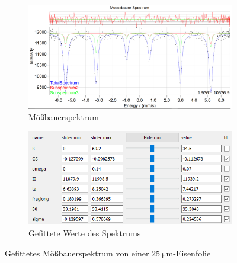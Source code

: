 \documentclass[german, %
parskip=full, %
bibliography=totoc, %
]{scrartcl}
\begin{document}
\begin{figure}[ht]
	\centering
	\begin{subfigure}[b]{0.5\textwidth}
		\includegraphics[width=\textwidth]{MoessbauerEisen25}
	  \caption{Mößbauerspektrum}
	  \label{fig:moess25}
  \end{subfigure}
  \begin{subfigure}[b]{0.4\textwidth}
	  \includegraphics[width=\textwidth]{WerteEisen25}
	  \caption{Gefittete Werte des Spektrums}
	  \label{fig:werte25}
  \end{subfigure}
	\caption{Gefittetes Mößbauerspektrum von einer \(\SI{25}{\micro\meter}\)-Eisenfolie}
	\label{fig:eisen25}
\end{figure}
\end{document}
